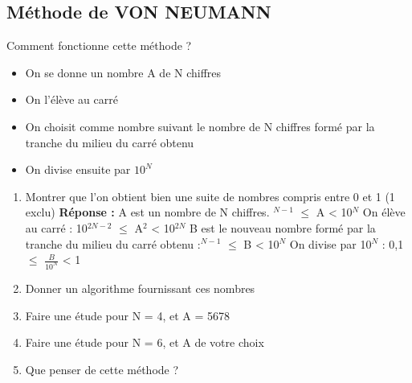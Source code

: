 \documentclass{book}
\begin{document}
\subsection{Méthode de VON NEUMANN}
Comment fonctionne cette méthode ?
\begin{itemize}
	\item On se donne un nombre A de N chiffres
	\item On l'élève au carré
	\item On choisit comme nombre suivant le nombre de N chiffres formé par la tranche du milieu du carré obtenu
	\item On divise ensuite par $10^N$
\end{itemize}
\begin{enumerate}
	\item Montrer que l'on obtient bien une suite de nombres compris entre 0 et 1 (1 exclu)\newline
	\textbf{Réponse :} A est un nombre de N chiffres. $^{N-1}$ $\le$ A < 10$^N$\newline
	On élève au carré : 10$^{2N-2}$ $\le$ A$^2$ < 10$^{2N}$\newline
	B est le nouveau nombre formé par la tranche du milieu du carré obtenu :$^{N-1}$ $\le$ B < 10$^N$\newline
	On divise par 10$^N$ : 0,1 $\le$ $\frac{B}{10^N}$  < 1\newline
	\item Donner un algorithme fournissant ces nombres
	\item Faire une étude pour N = 4, et A = 5678
	\item Faire une étude pour N = 6, et A de votre choix
	\item Que penser de cette méthode ?
\end{enumerate}
\end{document}

